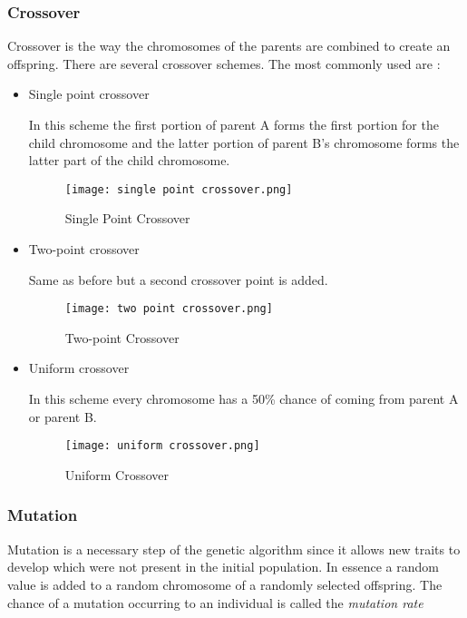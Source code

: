\subsubsection{Crossover}

Crossover is the way the chromosomes of the parents are combined to
create an offspring. There are several crossover schemes. The most
commonly used are :
\begin{samepage}
\begin{itemize}
\item
  Single point crossover

In this scheme the first portion of parent A forms the first portion for the child chromosome and the latter portion of parent B's chromosome
forms the latter part of the child chromosome.

\begin{figure}[H]
    \centering
    \texttt{[image: single point crossover.png]}
    \caption{Single Point Crossover \cite{kochenderfer2019}}

\end{figure}


\item
  Two-point crossover


Same as before but a second crossover point is added.

\begin{figure}[H]
    \centering
    \texttt{[image: two point crossover.png]}
    \caption{Two-point Crossover \cite{kochenderfer2019}}

\end{figure}

\item
  Uniform crossover


In this scheme every chromosome has a 50\% chance of coming from parent
A or parent B.
\begin{figure}[H]
    \centering
    \texttt{[image: uniform crossover.png]}
    \caption{Uniform Crossover \cite{kochenderfer2019}}

\end{figure}
\end{itemize}
\end{samepage}

\subsubsection{Mutation}

Mutation is a necessary step of the genetic algorithm since it allows new traits to develop which were not present in the initial population. In essence a random value is added to a random chromosome of a randomly selected offspring. The chance of a mutation occurring to an individual is called the \emph{mutation rate}

